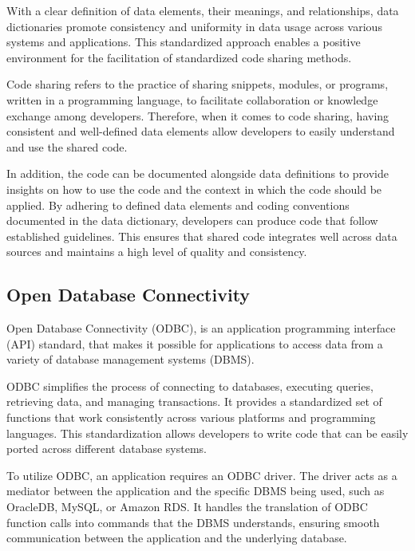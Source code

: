 With a clear definition of data elements, their meanings, and relationships, data dictionaries promote consistency and uniformity in data usage across various systems and applications. This standardized approach enables a positive environment for the facilitation of standardized code sharing methods. 

Code sharing refers to the practice of sharing snippets, modules, or programs, written in a programming language, to facilitate collaboration or knowledge exchange among developers. Therefore, when it comes to code sharing, having consistent and well-defined data elements allow developers to easily understand and use the shared code. 

In addition, the code can be documented alongside data definitions to provide insights on how to use the code and the context in which the code should be applied. By adhering to defined data elements and coding conventions documented in the data dictionary, developers can produce code that follow established guidelines. This ensures that shared code integrates well across data sources and maintains a high level of quality and consistency.

\subsection{Open Database Connectivity}
Open Database Connectivity (ODBC), is an application programming interface (API) standard, that makes it possible for applications to access data from a variety of database management systems (DBMS).

ODBC simplifies the process of connecting to databases, executing queries, retrieving data, and managing transactions. It provides a standardized set of functions that work consistently across various platforms and programming languages. This standardization allows developers to write code that can be easily ported across different database systems.

To utilize ODBC, an application requires an ODBC driver. The driver acts as a mediator between the application and the specific DBMS being used, such as OracleDB, MySQL, or Amazon RDS. It handles the translation of ODBC function calls into commands that the DBMS understands, ensuring smooth communication between the application and the underlying database.


